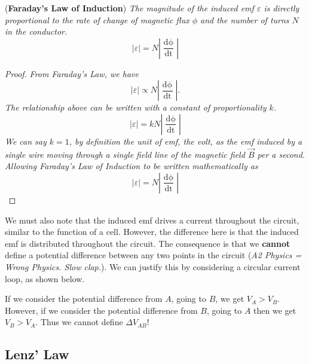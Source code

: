 \begin{theorem}{(\textbf{Faraday's Law of Induction})}
\textit{The magnitude of the induced emf $\varepsilon$ is directly proportional to the rate of change of magnetic flux $\phi$ and the number of turns $N$ in the conductor.}
\begin{equation}
    | \varepsilon | = N \left|\frac{\mathop{\mathrm{d}\phi}}{\mathop{\mathrm{d}t}}\right|
\end{equation}
\begin{proof}
\textit{From Faraday's Law, we have}
\begin{equation*}
    | \varepsilon | \propto N \left|\frac{\mathop{\mathrm{d}\phi}}{\mathop{\mathrm{d}t}}\right|.
\end{equation*}
\textit{The relationship above can be written with a constant of proportionality $k$.}
\begin{equation*}
    | \varepsilon | = kN \left|\frac{\mathop{\mathrm{d}\phi}}{\mathop{\mathrm{d}t}}\right|
\end{equation*}
\textit{We can say $k = 1$, by definition the unit of emf, the volt, as the emf induced by a single wire moving through a single field line of the magnetic field $\vec{B}$ per a second. Allowing Faraday's Law of Induction to be written mathematically as}
\begin{equation*}
    | \varepsilon | = N \left|\frac{\mathop{\mathrm{d}\phi}}{\mathop{\mathrm{d}t}}\right|
\end{equation*}
\end{proof}
\end{theorem}

We must also note that the induced emf drives a current throughout the circuit, similar to the function of a cell. However, the difference here is that the induced emf is distributed throughout the circuit. The consequence is that we \textbf{cannot} define a potential difference between any two points in the circuit (\textit{A2 Physics = Wrong Physics. Slow clap.}). We can justify this by considering a circular current loop, as shown below.

If we consider the potential difference from $A$, going to $B$, we get $V_A > V_B$. However, if we consider the potential difference from $B$, going to $A$ then we get $V_B > V_A$. Thus we cannot define $\Delta V_{AB}$!

\subsection{Lenz' Law}

